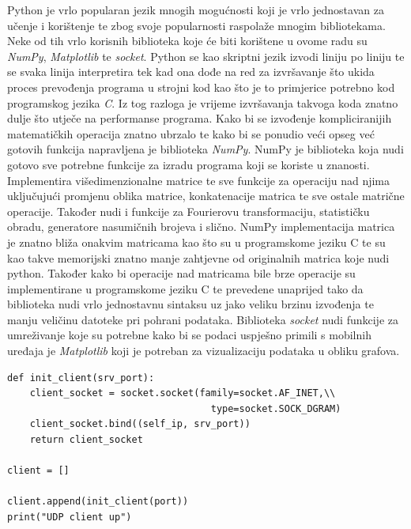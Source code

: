 \documentclass[times, utf8, diplomski]{fer}
\begin{document}
Python je vrlo popularan jezik mnogih mogućnosti koji je vrlo jednostavan za učenje i korištenje te zbog svoje popularnosti raspolaže mnogim bibliotekama.
Neke od tih vrlo korisnih biblioteka koje će biti korištene u ovome radu su \textit{NumPy}, \textit{Matplotlib} te \textit{socket}. Python se kao skriptni jezik
izvodi liniju po liniju te se svaka linija interpretira tek kad ona dođe na red za izvršavanje što ukida proces prevođenja programa u strojni kod kao što je to primjerice
potrebno kod programskog jezika \textit{C}. Iz tog razloga je vrijeme izvršavanja takvoga koda znatno dulje što utječe na performanse programa. Kako bi se
izvođenje kompliciranijih matematičkih operacija znatno ubrzalo te kako bi se ponudio veći opseg već gotovih funkcija napravljena je biblioteka \textit{NumPy}.
NumPy je biblioteka koja nudi gotovo sve potrebne funkcije za izradu programa koji se koriste u znanosti. Implementira višedimenzionalne matrice te sve funkcije
za operaciju nad njima uključujući promjenu oblika matrice, konkatenacije matrica te sve ostale matrične operacije. Također nudi i funkcije za Fourierovu transformaciju, statističku obradu,
generatore nasumičnih brojeva i slično. NumPy implementacija matrica je znatno bliža onakvim matricama kao što su u programskome jeziku C te su kao takve memorijski
znatno manje zahtjevne od originalnih matrica koje nudi python. Također kako bi operacije nad matricama bile brze operacije su implementirane u programskome jeziku C te
prevedene unaprijed tako da biblioteka nudi vrlo jednostavnu sintaksu uz jako veliku brzinu izvođenja te manju veličinu datoteke pri pohrani podataka.
Biblioteka \textit{socket} nudi funkcije za umreživanje koje su potrebne kako bi se podaci uspješno primili s mobilnih uređaja je \textit{Matplotlib} koji je potreban
za vizualizaciju podataka u obliku grafova.

\begin{lstlisting}[caption=Ostvarivanje veze na strani klijenta, label=socket]
def init_client(srv_port):
    client_socket = socket.socket(family=socket.AF_INET,\\
                                    type=socket.SOCK_DGRAM)
    client_socket.bind((self_ip, srv_port))
    return client_socket

client = []

client.append(init_client(port))
print("UDP client up") 
\end{lstlisting}
\end{document}
